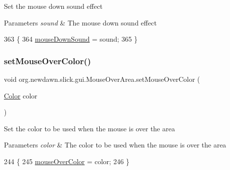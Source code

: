 Set the mouse down sound effect


\begin{DoxyParams}{Parameters}
{\em sound} & The mouse down sound effect \\
\hline
\end{DoxyParams}

\begin{DoxyCode}
363                                                \{
364         \mbox{\hyperlink{classorg_1_1newdawn_1_1slick_1_1gui_1_1_mouse_over_area_aceac9fd935c90a7fef2fbd5204df3de1}{mouseDownSound}} = sound;
365     \}
\end{DoxyCode}
\mbox{\label{classorg_1_1newdawn_1_1slick_1_1gui_1_1_mouse_over_area_a119e40b4e9db8a0828d38b9d9da85ab7}} 
\subsubsection{\texorpdfstring{set\+Mouse\+Over\+Color()}{setMouseOverColor()}}
{\footnotesize\ttfamily void org.\+newdawn.\+slick.\+gui.\+Mouse\+Over\+Area.\+set\+Mouse\+Over\+Color (\begin{DoxyParamCaption}\item[{\mbox{\hyperlink{classorg_1_1newdawn_1_1slick_1_1_color}{Color}}}]{color }\end{DoxyParamCaption})\hspace{0.3cm}{\ttfamily [inline]}}

Set the color to be used when the mouse is over the area


\begin{DoxyParams}{Parameters}
{\em color} & The color to be used when the mouse is over the area \\
\hline
\end{DoxyParams}

\begin{DoxyCode}
244                                                \{
245         \mbox{\hyperlink{classorg_1_1newdawn_1_1slick_1_1gui_1_1_mouse_over_area_ad12811ff53af05cc21b12795179f6132}{mouseOverColor}} = color;
246     \}
\end{DoxyCode}
\mbox{\label{classorg_1_1newdawn_1_1slick_1_1gui_1_1_mouse_over_area_ac698635f987336a7665fd8c88b228181}} 
